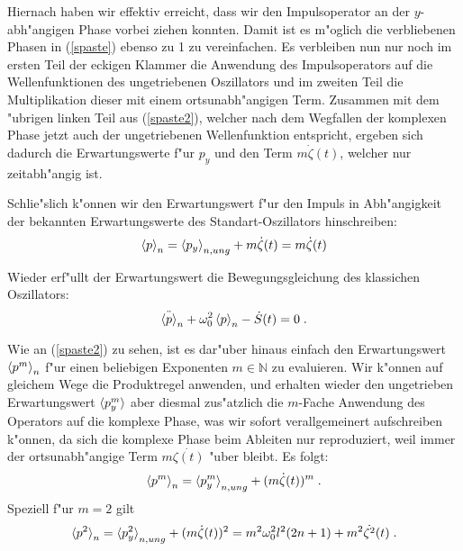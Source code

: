     Hiernach haben wir effektiv erreicht, dass wir den Impulsoperator an der $y$-abh"angigen Phase vorbei ziehen konnten.
    Damit ist es m"oglich die verbliebenen Phasen in (\ref{spaste}) ebenso zu 1 zu vereinfachen.
    Es verbleiben nun nur noch im ersten Teil der eckigen Klammer die Anwendung des Impulsoperators auf die Wellenfunktionen des ungetriebenen Oszillators und im zweiten Teil die Multiplikation dieser mit einem ortsunabh"angigen Term.
    Zusammen mit dem "ubrigen linken Teil aus (\ref{spaste2}), welcher nach dem Wegfallen der komplexen Phase jetzt auch der ungetriebenen Wellenfunktion entspricht, ergeben sich dadurch die Erwartungswerte f"ur $p_y$ und den Term $m\dot{\zeta}(t)$, welcher nur zeitabh"angig ist.

    Schlie"slich k"onnen wir den Erwartungswert f"ur den Impuls in Abh"angigkeit der bekannten Erwartungswerte des Standart-Oszillators hinschreiben:
    \begin{align}
      \braket{p}_n = \braket{p_y}_{n,ung} + m\dot{\zeta}(t) = m\dot{\zeta}(t)
    \end{align}

    Wieder erf"ullt der Erwartungswert die Bewegungsgleichung des klassichen Oszillators:
    \begin{equation}
      \ddot{\braket{p}}_n + \omega_0^2\braket{p}_n - \dot{S}(t) = 0 \; .
    \end{equation}

    Wie an (\ref{spaste2}) zu sehen, ist es dar"uber hinaus einfach den Erwartungswert $\braket{p^m}_n$ f"ur einen beliebigen Exponenten $m \in \mathbb{N}$ zu evaluieren.
    Wir k"onnen auf gleichem Wege die Produktregel anwenden, und erhalten wieder den ungetrieben Erwartungswert $\braket{p^m_y}$ aber diesmal zus"atzlich die $m$-Fache Anwendung des Operators auf die komplexe Phase, was wir sofort verallgemeinert aufschreiben k"onnen, da sich die komplexe Phase beim Ableiten nur reproduziert, weil immer der ortsunabh"angige Term $m\dot{\zeta(t)}$ "uber bleibt.
    Es folgt:
    \begin{equation}
      \braket{p^m}_n = \braket{p^m_y}_{n,ung} + (m\dot{\zeta}(t))^m \; .
    \end{equation}
    Speziell f"ur $m=2$ gilt
    \begin{equation}
      \braket{p^2}_n = \braket{p^2_y}_{n,ung} + (m\dot{\zeta}(t))^2 = m^2\omega^2_0 l^2(2n+1) + m^2\dot{\zeta^2}(t) \; .
    \end{equation}


